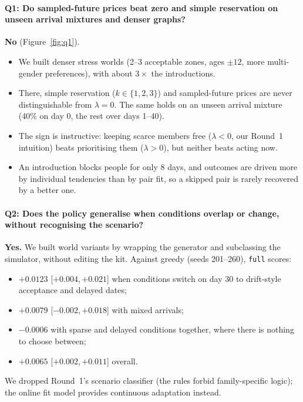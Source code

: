 \documentclass[10pt]{article}
\newcommand{\full}{\texttt{full}}
\newcommand{\ci}[2]{[$#1$,\,$#2$]}
\begin{document}
\paragraph{Q1: Do sampled-future prices beat zero and simple reservation on unseen arrival mixtures and denser graphs?} \textbf{No} (Figure~\ref{fig:q1}).
\begin{itemize}
\item We built denser stress worlds (2--3 acceptable zones, ages $\pm12$, more multi-gender preferences), with about $3\times$ the introductions.
\item There, simple reservation ($k\in\{1,2,3\}$) and sampled-future prices are never distinguishable from $\lambda=0$. The same holds on an unseen arrival mixture (40\% on day 0, the rest over days 1--40).
\item The sign is instructive: keeping scarce members free ($\lambda<0$, our Round~1 intuition) beats prioritising them ($\lambda>0$), but neither beats acting now.
\item An introduction blocks people for only 8 days, and outcomes are driven more by individual tendencies than by pair fit, so a skipped pair is rarely recovered by a better one.
\end{itemize}

\paragraph{Q2: Does the policy generalise when conditions overlap or change, without recognising the scenario?} \textbf{Yes.} We built world variants by wrapping the generator and subclassing the simulator, without editing the kit. Against greedy (seeds 201--260), \full{} scores:
\begin{itemize}
\item $+0.0123$ \ci{+0.004}{+0.021} when conditions switch on day 30 to drift-style acceptance and delayed dates;
\item $+0.0079$ \ci{-0.002}{+0.018} with mixed arrivals;
\item $-0.0006$ with sparse and delayed conditions together, where there is nothing to choose between;
\item $+0.0065$ \ci{+0.002}{+0.011} overall.
\end{itemize}
We dropped Round~1's scenario classifier (the rules forbid family-specific logic); the online fit model provides continuous adaptation instead.
\end{document}
